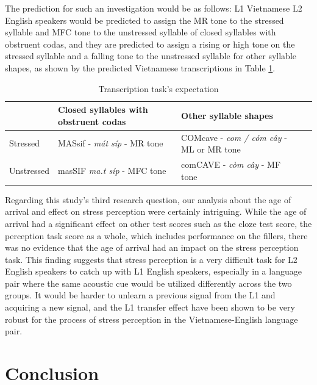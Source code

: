 \documentclass[a4paper]{article}
\begin{document}
The prediction for such an investigation would be as follows: L1 Vietnamese L2 English speakers would be predicted to assign the MR tone to the stressed syllable and MFC tone to the unstressed syllable of closed syllables with obstruent codas, and they are predicted to assign a rising or high tone on the stressed syllable and a falling tone to the unstressed syllable for other syllable shapes, as shown by the predicted Vietnamese transcriptions in Table \ref{tab:table8}.

\begin{table}[H]
  \begin{center}
    \caption{Transcription task's expectation}
    \label{tab:table8}
      \begin{tabular}{|p{5cm}|p{4cm}|p{4cm}|p{4cm}}
      \hline
       & Closed syllables with obstruent codas & Other syllable shapes \\
      \hline
      Stressed & MASsif - \textit{mát síp} - MR tone & COMcave - \textit{com / cóm cây} - ML or MR tone \\
      \hline
      Unstressed & masSIF \textit{ma.t síp} - MFC tone & comCAVE - \textit{còm cây} - MF tone \\
      \hline
    \end{tabular}
  \end{center}
\end{table}

Regarding this study's third research question, our analysis about the age of arrival and effect on stress perception were certainly intriguing. While the age of arrival had a significant effect on other test scores such as the cloze test score, the perception task score as a whole, which includes performance on the fillers, there was no evidence that the age of arrival had an impact on the stress perception task. This finding suggests that stress perception is a very difficult task for L2 English speakers to catch up with L1 English speakers, especially in a language pair where the same acoustic cue would be utilized differently across the two groups. It would be harder to unlearn a previous signal from the L1 and acquiring a new signal, and the L1 transfer effect have been shown to be very robust for the process of stress perception in the Vietnamese-English language pair.


\section{Conclusion}
\end{document}

